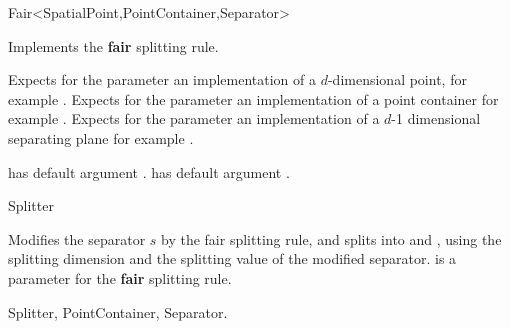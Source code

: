 

\begin{ccRefFunctionObjectClass}{Fair<SpatialPoint,PointContainer,Separator>}  %


\ccDefinition
Implements the {\bf fair} splitting rule.

\ccParameters

Expects for the parameter  an implementation of a $d$-dimensional point,
for example . Expects for the parameter  an implementation
of a point container for example .
Expects for the parameter  an implementation of a $d$-1 dimensional 
separating plane for example .

 has default argument .
 has default argument . 


\ccIsModel

Splitter

\ccTypes



\ccOperations

{Modifies the separator $s$ by the fair splitting rule, 
and splits  into  and ,
using the splitting dimension and the splitting value of the modified separator.
 is a parameter for the {\bf fair} splitting rule.
}

\ccSeeAlso

Splitter, PointContainer, Separator.

\end{ccRefFunctionObjectClass}


